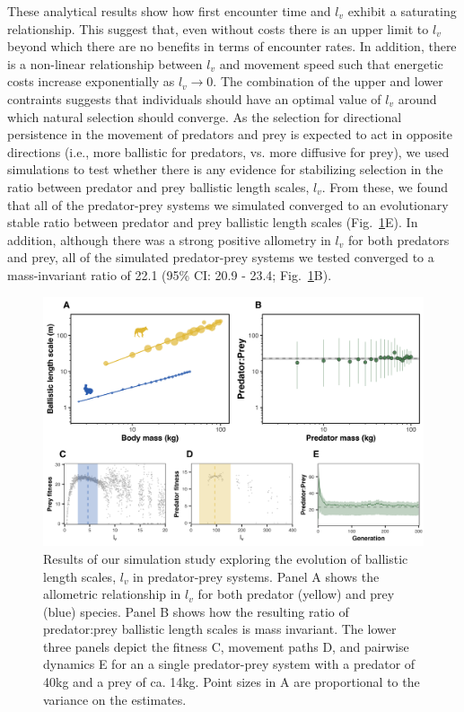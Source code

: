 \documentclass[12pt]{article}
\begin{document}
These analytical results show how first encounter time and $l_v$ exhibit a saturating relationship. This suggest that, even without costs there is an upper limit to $l_v$ beyond which there are no benefits in terms of encounter rates.  In addition, there is a non-linear relationship between $l_v$ and movement speed such that energetic costs increase exponentially as $l_v \to 0$. The combination of the upper and lower contraints suggests that individuals should have an optimal value of $l_v$ around which natural selection should converge. As the selection for directional persistence in the movement of predators and prey is expected to act in opposite directions (i.e., more ballistic for predators, vs. more diffusive for prey), we used simulations to test whether there is any evidence for stabilizing selection in the ratio between predator and prey ballistic length scales, $l_v$. From these, we found that all of the predator-prey systems we simulated converged to an evolutionary stable ratio between predator and prey ballistic length scales (Fig.~\ref{fig:sim_res}E). In addition, although there was a strong positive allometry in $l_v$ for both predators and prey, all of the simulated predator-prey systems we tested converged to a mass-invariant ratio of 22.1 (95\% CI: 20.9 - 23.4; Fig.~\ref{fig:sim_res}B).


\begin{figure}[!h]
\centering
\includegraphics[scale=0.9]{lv_Scaling_Simulations.png}
\caption{Results of our simulation study exploring the evolution of ballistic length scales, $l_v$ in predator-prey systems. Panel A shows the allometric relationship in $l_v$ for both predator (yellow) and prey (blue) species. Panel B shows how the resulting ratio of predator:prey ballistic length scales is mass invariant. The lower three panels depict the fitness C, movement paths D, and pairwise dynamics E for an a single predator-prey system with a predator of 40kg and a prey of ca. 14kg. Point sizes in A are proportional to the variance on the estimates.}
\label{fig:sim_res}
\end{figure}
\end{document}
